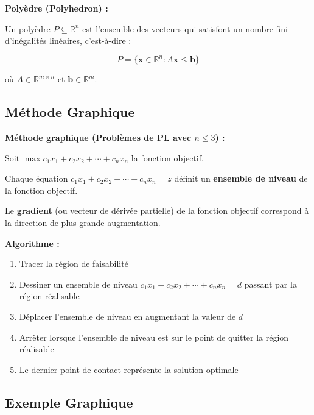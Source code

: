 \documentclass[12pt,a4paper]{article}
\begin{document}
\begin{definition}
\textbf{Polyèdre (Polyhedron) :}

Un polyèdre $P \subseteq \mathbb{R}^n$ est l'ensemble des vecteurs qui satisfont un nombre fini d'inégalités linéaires, c'est-à-dire :

$$P = \{\mathbf{x} \in \mathbb{R}^n : A\mathbf{x} \leq \mathbf{b}\}$$

où $A \in \mathbb{R}^{m \times n}$ et $\mathbf{b} \in \mathbb{R}^m$.
\end{definition}

\newpage
\subsection{Méthode Graphique}

\begin{methode}
\textbf{Méthode graphique (Problèmes de PL avec $n \leq 3$) :}

Soit $\max c_1x_1 + c_2x_2 + \cdots + c_nx_n$ la fonction objectif.

Chaque équation $c_1x_1 + c_2x_2 + \cdots + c_nx_n = z$ définit un \textcolor{titrebleu}{\textbf{ensemble de niveau}} de la fonction objectif.

Le \textcolor{defvert}{\textbf{gradient}} (ou vecteur de dérivée partielle) de la fonction objectif correspond à la direction de plus grande augmentation.

\textbf{Algorithme :}
\begin{enumerate}
    \item \textcolor{titrebleu}{Tracer la région de faisabilité}
    \item \textcolor{defvert}{Dessiner un ensemble de niveau} $c_1x_1 + c_2x_2 + \cdots + c_nx_n = d$ passant par la région réalisable
    \item \textcolor{algoviolet}{Déplacer l'ensemble de niveau} en augmentant la valeur de $d$
    \item \textcolor{exempleorange}{Arrêter} lorsque l'ensemble de niveau est sur le point de quitter la région réalisable
    \item \textcolor{importantrouge}{Le dernier point de contact} représente la solution optimale
\end{enumerate}
\end{methode}

\newpage
\subsection{Exemple Graphique}
\end{document}
